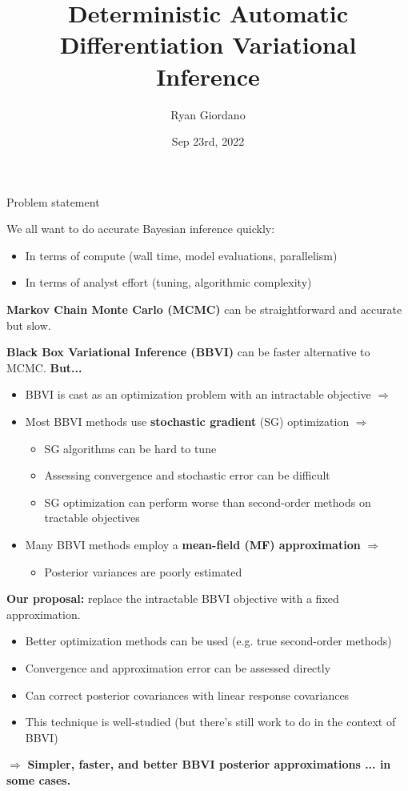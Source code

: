 \documentclass[8pt]{beamer}\usepackage[]{graphicx}\usepackage[]{color}
\title{Deterministic Automatic Differentiation Variational Inference}
\author{Ryan Giordano}
\date{Sep 23rd, 2022}
\institute{Massachusetts Institute of Technology}
\begin{document}

\begin{frame}{Problem statement}

We all want to do accurate Bayesian inference quickly:
%
\begin{itemize}
    \item In terms of compute (wall time, model evaluations, parallelism)
    \item In terms of analyst effort (tuning, algorithmic complexity)
\end{itemize}
%
\textbf{Markov Chain Monte Carlo (MCMC)} can be
straightforward and accurate but slow.

\pause
\vspace{-0.5em}
\hrulefill

\textbf{Black Box Variational Inference (BBVI)} can be faster alternative to MCMC.
%
\textbf{But...}

%
\begin{itemize}
    \item BBVI is cast as an optimization problem with an intractable objective $\Rightarrow$
    \item Most BBVI methods use \textbf{stochastic gradient} (SG) optimization $\Rightarrow$
    \begin{itemize}
        \item SG algorithms can be hard to tune
        \item Assessing convergence and stochastic error can be difficult
        \item SG optimization can perform worse than second-order methods on tractable objectives
    \end{itemize}
    \item Many BBVI methods employ a \textbf{mean-field (MF) approximation} $\Rightarrow$
    \begin{itemize}
        \item Posterior variances are poorly estimated
    \end{itemize}
\end{itemize}
%
\pause
\vspace{-0.5em}
\hrulefill

\textbf{Our proposal:}
replace the intractable BBVI objective with a fixed approximation.
%
\begin{itemize}
    \item Better optimization methods can be used (e.g. true second-order methods)
    \item Convergence and approximation error can be assessed directly
    \item Can correct posterior covariances with linear response covariances
    \item This technique is well-studied (but there's still work to do in the context of BBVI)
\end{itemize}
%
$\Rightarrow$
\textbf{Simpler, faster, and better BBVI posterior approximations ... in some cases.}
%
\end{frame}
\end{document}
